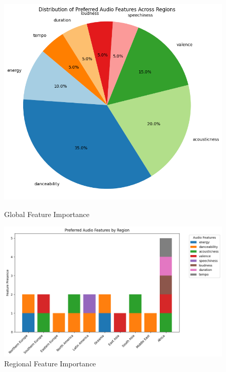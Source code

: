 \begin{figure}[H]
    \centering
    \begin{minipage}{0.45\textwidth}
        \centering
        \includegraphics[width=\linewidth]{media/features_preferences.png}
        \caption{Global Feature Importance}
    \end{minipage}%
    \hspace{0.05\textwidth} %
    \begin{minipage}{0.45\textwidth}
        \centering
        \includegraphics[width=\linewidth]{media/feature_preferences_regions.png}
        \caption{Regional Feature Importance}
    \end{minipage}
\end{figure}